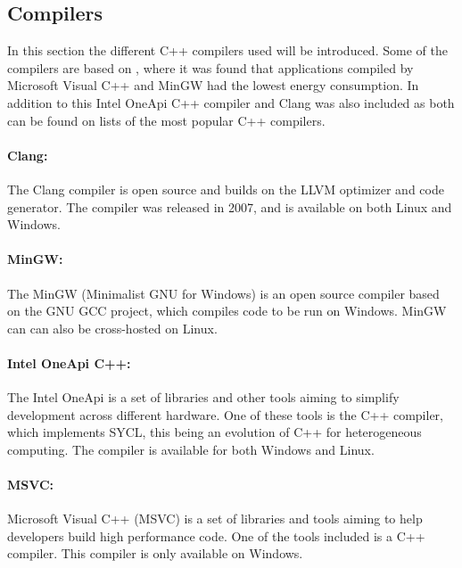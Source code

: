 \subsection{Compilers}

In this section the different C++ compilers used will be introduced. Some of the compilers are based on \cite{hassan2017}, where it was found that applications compiled by Microsoft Visual C++ and MinGW had the lowest energy consumption. In addition to this Intel OneApi C++ compiler and Clang was also included as both can be found on lists of the most popular C++ compilers\cite{mycplus, educba, softwaretestinghelp}. 



\paragraph{Clang:} The Clang compiler is open source and builds on the LLVM optimizer and code generator. The compiler was released in 2007, and is available on both Linux and Windows.\cite{clang}

\paragraph*{MinGW:} The MinGW (Minimalist GNU for Windows) is an open source compiler based on the GNU GCC project, which compiles code to be run on Windows. MinGW can can also be cross-hosted on Linux.\cite{mingw}

\paragraph*{Intel OneApi C++:} The Intel OneApi is a set of libraries and other tools aiming to simplify development across different hardware. One of these tools is the C++ compiler, which implements SYCL, this being an evolution of C++ for heterogeneous computing. The compiler is available for both Windows and Linux.\cite{oneapi}

\paragraph*{MSVC:} Microsoft Visual C++ (MSVC) is a set of libraries and tools aiming to help developers build high performance code. One of the tools included is a C++ compiler. This compiler is only available on Windows.\cite{msvc}

